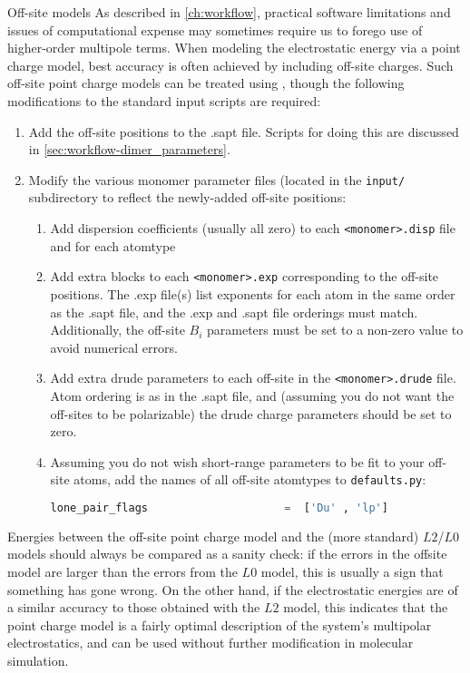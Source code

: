 \begin{paragraph}{Off-site models}
As described in \cref{ch:workflow}, practical software limitations and issues
of computational expense may sometimes require us to forego use of
higher-order multipole terms. 
When modeling the electrostatic energy via a point charge model, best accuracy
is often achieved by including off-site charges. Such off-site point charge
models can be treated using \pointer, though 
the following modifications to the standard input scripts are required:
\begin{enumerate}
\item Add the off-site positions to the .sapt file. Scripts for doing this are
discussed in \cref{sec:workflow-dimer_parameters}.
\item Modify the various monomer parameter files (located in the \verb|input/|
subdirectory to reflect the newly-added off-site positions:
    \begin{enumerate}
    \item Add dispersion coefficients (usually all zero) to each
            \verb|<monomer>.disp| file and for each atomtype
    \item Add extra blocks to each \verb|<monomer>.exp| corresponding to the
off-site positions. The .exp file(s) list exponents for each atom in the same
order as the .sapt file, and the .exp and .sapt file orderings must match.
Additionally, the off-site $B_i$ parameters must be set to a non-zero value to
avoid numerical errors.
    \item Add extra drude parameters to each off-site in the
\verb|<monomer>.drude| file. Atom ordering is as in the .sapt file, and
(assuming you do not want the off-sites to be polarizable) the drude charge
parameters should be set to zero.
    \item Assuming you do not wish short-range parameters to be fit to your
off-site atoms, add the names of all off-site atomtypes to \verb|defaults.py|:
\begin{lstlisting}[language=python]
lone_pair_flags                     =  ['Du' , 'lp']
\end{lstlisting}
    \end{enumerate}
\end{enumerate}
%
Energies between the off-site point charge model and the (more standard) $L2$/$L0$ models should
always be compared as a sanity check: if the errors in the offsite model are
larger than the errors from the $L0$ model, this is usually a sign that
something has gone wrong. On the other hand, if the electrostatic energies are
of a similar accuracy to those obtained with the $L2$ model, this indicates
that the point charge model is a fairly optimal description of the system's
multipolar electrostatics, and can be used without further modification in
molecular simulation.
\end{paragraph}

